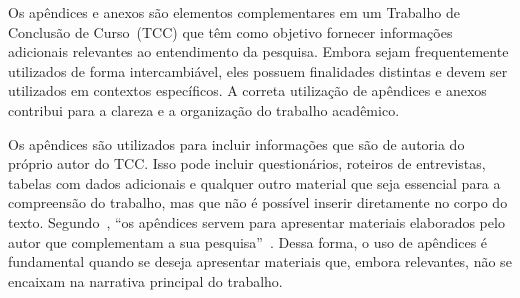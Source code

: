 

Os apêndices e anexos são elementos complementares em um Trabalho de Conclusão de Curso~(TCC) que têm como objetivo fornecer informações adicionais relevantes ao entendimento da pesquisa. Embora sejam frequentemente utilizados de forma intercambiável, eles possuem finalidades distintas e devem ser utilizados em contextos específicos. A correta utilização de apêndices e anexos contribui para a clareza e a organização do trabalho acadêmico.

Os apêndices são utilizados para incluir informações que são de autoria do próprio autor do TCC. Isso pode incluir questionários, roteiros de entrevistas, tabelas com dados adicionais e qualquer outro material que seja essencial para a compreensão do trabalho, mas que não é possível inserir diretamente no corpo do texto. Segundo~, ``os apêndices servem para apresentar materiais elaborados pelo autor que complementam a sua pesquisa''~\cite{severino}. Dessa forma, o uso de apêndices é fundamental quando se deseja apresentar materiais que, embora relevantes, não se encaixam na narrativa principal do trabalho.
